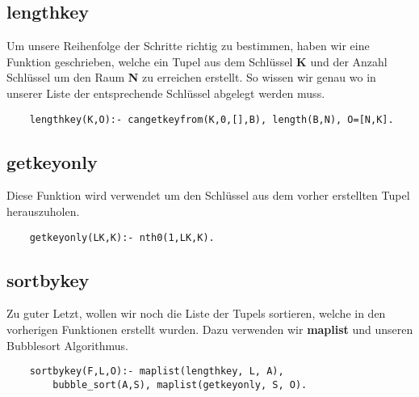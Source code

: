 \newpage

\subsection{lengthkey}
Um unsere Reihenfolge der Schritte richtig zu bestimmen, haben wir eine Funktion geschrieben,
welche ein Tupel aus dem Schlüssel \textbf{K} und der Anzahl Schlüssel um den Raum \textbf{N}
zu erreichen erstellt. So wissen wir genau wo in unserer Liste der entsprechende Schlüssel
abgelegt werden muss.

\begin{verbatim}
    lengthkey(K,O):- cangetkeyfrom(K,0,[],B), length(B,N), O=[N,K].
\end{verbatim}

\subsection{getkeyonly}
Diese Funktion wird verwendet um den Schlüssel aus dem vorher erstellten Tupel herauszuholen.

\begin{verbatim}
    getkeyonly(LK,K):- nth0(1,LK,K).
\end{verbatim}

\subsection{sortbykey}
Zu guter Letzt, wollen wir noch die Liste der Tupels sortieren, welche in den vorherigen Funktionen
erstellt wurden. Dazu verwenden wir \textbf{maplist} und unseren Bubblesort Algorithmus.

\begin{verbatim}
    sortbykey(F,L,O):- maplist(lengthkey, L, A), 
        bubble_sort(A,S), maplist(getkeyonly, S, O).
\end{verbatim}